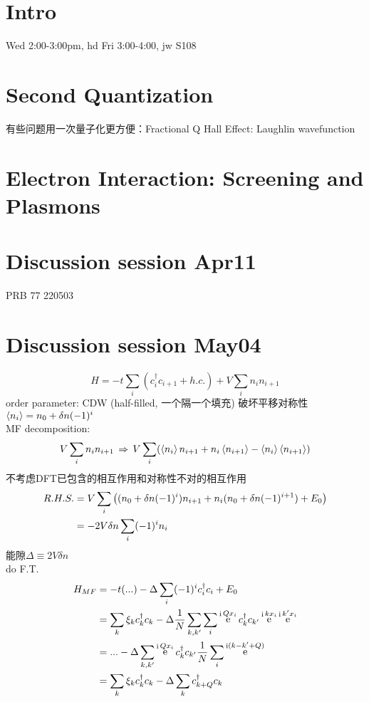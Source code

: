 \documentclass[a4paper]{article}
\DeclareMathOperator{\e}{\mathrm{e}}
\DeclareMathOperator{\I}{\mathrm{i}}
\DeclareMathOperator{\dra}{\;\Rightarrow\;}
\numberwithin{equation}{section}
\begin{document}
\section{Intro}
Wed 2:00-3:00pm, hd
Fri 3:00-4:00, jw S108

\section{Second Quantization}
有些问题用一次量子化更方便：Fractional Q Hall Effect: Laughlin wavefunction

\section{Electron Interaction: Screening and Plasmons}


\section*{Discussion session Apr11}

PRB 77 220503\\

\section*{Discussion session May04}
\begin{equation}\label{key}
H = -t \sum_i (c_i^\dagger c_{i+1} + h.c.) + V\sum_i n_i n_{i+1}
\end{equation}
order parameter:
CDW (half-filled, 一个隔一个填充) 破坏平移对称性\\
$ \ev{n_i} = n_0 + \delta n (-1)^i $\\

MF decomposition:
\begin{equation}\label{key}
V\sum_i n_i n_{i+1} \dra V\sum_i (\ev{n_i} n_{i+1} + n_i \ev{n_{i+1}} - \ev{n_i} \ev{n_{i+1}})
\end{equation}
不考虑DFT已包含的相互作用和对称性不对的相互作用\\

\begin{align}\label{key}
R.H.S. &= V\sum_i \qty((n_0 + \delta n(-1)^i) n_{i+1} + n_i (n_0 + \delta n(-1)^{i+1}) + E_0) \notag\\
&= -2V\delta n \sum_i (-1)^i n_i
\end{align}
能隙$ \Delta \equiv 2V\delta n $ \\
do F.T.
\begin{align}
H_{MF} &= -t (...) - \Delta \sum_i (-1)^i c_i^\dagger c_i + E_0 \notag\\
&= \sum_k \xi_k c_k^\dagger c_k - \Delta \dfrac{1}{N}\sum_{k,k'} \sum_i \e^{\I Q x_i} c_k^\dagger c_{k'} \e^{\I k x_i} \e^{\I k' x_i} \notag\\
&= ... - \Delta \sum_{k,k'} \e^{\I Q x_i} c_k^\dagger c_{k'} \dfrac{1}{N}\sum_i \e^{\I(k - k' + Q)} \notag\\
&= \sum_k \xi_k c_k^\dagger c_k - \Delta \sum_{k}  c_{k+Q}^\dagger c_k
\end{align}
\end{document}
